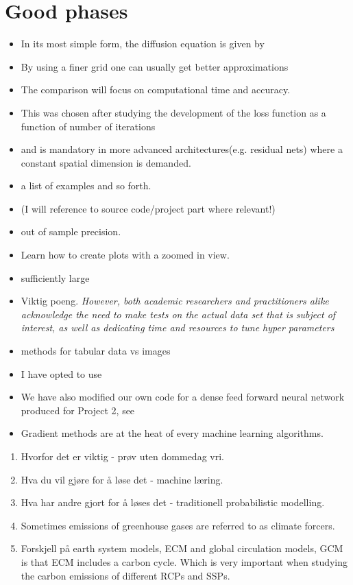 \section{Good phases}
\begin{itemize}
    \item  In its most simple form, the diffusion equation is given by
    \item By using a finer grid one can usually get better approximations
    \item The comparison will focus on computational time and accuracy.
    \item This was chosen after
studying the development of the loss function as a function of number of iterations
    \item and is mandatory in
more advanced architectures(e.g. residual nets) where a constant spatial
dimension is demanded.
    \item a list of examples and so forth.
    \item (I will reference to source code/project part where relevant!)
    \item out of sample precision.
    \item Learn how to create plots with a zoomed in view.
    \item sufficiently large
    \item Viktig poeng. \textit{However, both academic
researchers and practitioners alike acknowledge the
need to make tests on the actual data set that is
subject of interest, as well as dedicating time and
resources to tune hyper parameters}
    \item methods for tabular data vs images
    \item I have opted to use
    \item We have also modified our own code for a dense feed forward neural
network produced for Project 2, see
    \item Gradient methods are at the heat of every machine learning algorithms. 
\end{itemize}

\begin{enumerate}
    \item Hvorfor det er viktig - prøv uten dommedag vri.
    \item Hva du vil gjøre for å løse det -  machine læring.
    \item Hva har andre gjort for å løses det - traditionell probabilistic modelling. 
    \item Sometimes emissions of greenhouse gases are referred to as climate forcers.
    \item Forskjell på earth system models, ECM and global circulation models, GCM is that ECM includes a carbon cycle. Which is very important when studying the carbon emissions of different RCPs and SSPs.
\end{enumerate}

